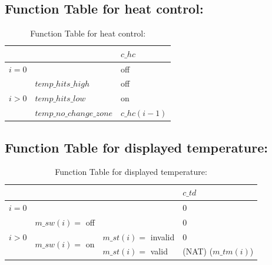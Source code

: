 \documentclass[fontsize=12pt,paper=letter,twoside]{scrartcl}
\begin{document}
\subsection{Function Table for heat control: }
\begin{table}[htb!]
\centering
\begin{tabular}{ll|l|}
\cline{3-3}
                                                      &                                                                                & $c\_hc$      \\ \hline
\multicolumn{2}{|l|}{$i=0$}                                                                                                              & off        \\ \hline
\multicolumn{1}{|l|}{\multirow{3}{*}{$i > 0$}} & $temp\_hits\_high$ \footnotemark                                                & off        \\ \cline{2-3}
\multicolumn{1}{|l|}{}                                & $temp\_hits\_low$ \footnotemark                                               & on         \\ \cline{2-3}
\multicolumn{1}{|l|}{}                                & $temp\_no\_change\_zone$ \footnotemark & $c\_hc(i-1)$ \\ \hline
\end{tabular}
\caption{Function Table for heat control: }
\end{table}

\subsection{Function Table for displayed temperature: }
\begin{table}[htb!]
\centering
\label{my-label}
\begin{tabular}{lll|l|}
\cline{4-4}
                                                        &                                                     &                    & $c\_td$            \\ \hline
\multicolumn{3}{|l|}{$i = 0$}                                                                                                        & 0                \\ \hline
\multicolumn{1}{|l|}{\multirow{3}{*}{$i > 0$}} & \multicolumn{2}{l|}{$m\_sw(i) =$ off}                                      & 0                \\ \cline{2-4}
\multicolumn{1}{|l|}{}                                  & \multicolumn{1}{l|}{\multirow{2}{*}{$m\_sw(i) =$ on}} & $m\_st(i) =$ invalid & 0                \\ \cline{3-4}
\multicolumn{1}{|l|}{}                                  & \multicolumn{1}{l|}{}                               & $m\_st(i) =$ valid   & (NAT) ($m\_tm(i)$) \\ \hline
\end{tabular}
\caption{Function Table for displayed temperature: }
\end{table}
\end{document}
